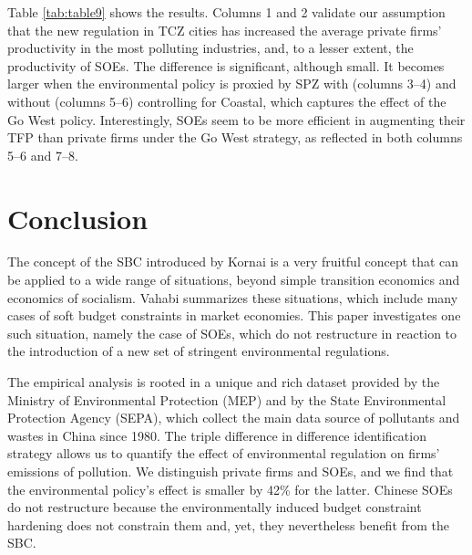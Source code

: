 \documentclass[12pt]{article}
\begin{document}
Table \ref{tab:table9} shows the results. Columns 1 and 2 validate our assumption that the new regulation in TCZ cities has increased the average private firms' productivity in the most polluting industries, and, to a lesser extent, the productivity of SOEs. The difference is significant, although small. It becomes larger when the environmental policy is proxied by SPZ with (columns 3–4) and without (columns 5–6) controlling for Coastal, which captures the effect of the Go West policy. Interestingly, SOEs seem to be more efficient in augmenting their TFP than private firms under the Go West strategy, as reflected in both columns 5–6 and 7–8.

\section{Conclusion} \label{sec:conclusion}

The concept of the SBC introduced by Kornai \citeyear{Kornai1993-kg} is a very fruitful concept that can be applied to a wide range of situations, beyond simple transition economics and economics of socialism. Vahabi \citeyear{Vahabi2001-bp, Vahabi2014-qy} summarizes these situations, which include many cases of soft budget constraints in market economies. This paper investigates one such situation, namely the case of SOEs, which do not restructure in reaction to the introduction of a new set of stringent environmental regulations. 

The empirical analysis is rooted in a unique and rich dataset provided by the Ministry of Environmental Protection (MEP) and by the State Environmental Protection Agency (SEPA), which collect the main data source of pollutants and wastes in China since 1980. The triple difference in difference identification strategy allows us to quantify the effect of environmental regulation on firms' emissions of pollution. We distinguish private firms and SOEs, and we find that the environmental policy's effect is smaller by 42\% for the latter. Chinese SOEs do not restructure because the environmentally induced budget constraint hardening does not constrain them and, yet, they nevertheless benefit from the SBC. 

\singlespacing
\setlength\bibsep{0pt}

\clearpage

%


\end{document}
